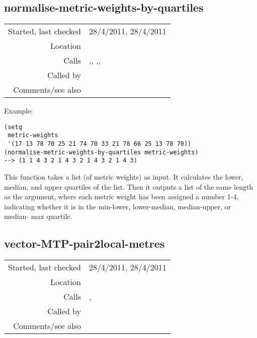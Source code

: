 \subsection*{normalise-metric-weights-by-quartiles}\label{fun:normalise-metric-weights-by-quartiles}

\vspace{0.3cm}
\begin{tabular}{r|p{8cm}}
Started, last checked & 28/4/2011, 28/4/2011 \\
Location & \nameref{sec:inner-metric-analysis} \\
Calls & \nameref{fun:orthogonal-projection-unique-equalp},\newline \nameref{fun:read-from-file}, \nameref{fun:SIA-reflected-merge-sort},\newline \nameref{fun:vector-MTP-pairs2local-metres}, \nameref{fun:write-to-file} \\
Called by & \nameref{fun:general-metric-weights} \\
Comments/see also & 
\end{tabular}

\vspace{0.5cm}
\noindent Example:
\begin{verbatim}
(setq
 metric-weights
 '(17 13 78 70 25 21 74 70 33 21 78 66 25 13 78 70))
(normalise-metric-weights-by-quartiles metric-weights)
--> (1 1 4 3 2 1 4 3 2 1 4 3 2 1 4 3)
\end{verbatim}

\noindent This function takes a list (of metric weights)
as input. It calculates the lower, median, and upper
quartiles of the list. Then it outputs a list of the
same length as the argument, where each metric weight
has been assigned a number 1-4, indicating whether it is
in the min-lower, lower-median, median-upper, or median-
max quartile.


\subsection*{vector-MTP-pair2local-metres}\label{fun:vector-MTP-pair2local-metres}

\vspace{0.3cm}
\begin{tabular}{r|p{8cm}}
Started, last checked & 28/4/2011, 28/4/2011 \\
Location & \nameref{sec:inner-metric-analysis} \\
Calls & \nameref{fun:add-two-lists}, \nameref{fun:vector-MTP-pair2local-metres} \\
Called by & \nameref{fun:vector-MTP-pairs2local-metres} \\
Comments/see also & 
\end{tabular}

